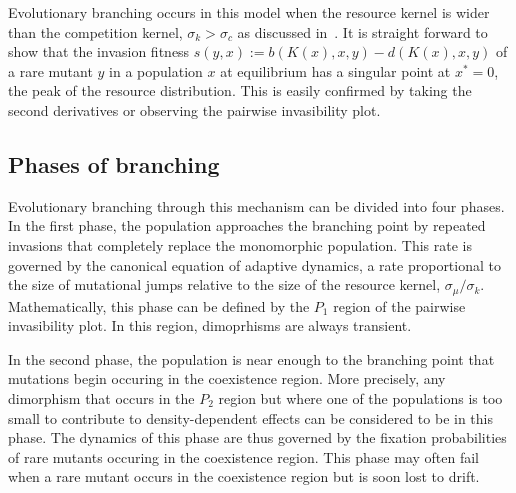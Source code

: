 \documentclass{article}
\begin{document}

Evolutionary branching occurs in this model when the resource kernel is wider than the competition kernel, $\sigma_k > \sigma_c$ as discussed in~\citet{geritz_evoeco1998, dieckmann_nat1999}.  It is straight forward to show that the invasion fitness $s(y,x) := b(K(x),x,y) -d(K(x), x,y)$ of a rare mutant $y$ in a population $x$ at equilibrium has a singular point at $x^*=0$, the peak of the resource distribution.  This is easily confirmed by taking the second derivatives or observing the pairwise invasibility plot.  


\subsection{Phases of branching}
Evolutionary branching through this mechanism can be divided into four phases.  In the first phase, the population approaches the branching point by repeated invasions that completely replace the monomorphic population.  This rate is governed by the canonical equation of adaptive dynamics, a rate proportional to the size of mutational jumps relative to the size of the resource kernel, $\sigma_{\mu}/\sigma_k$.  Mathematically, this phase can be defined by the $P_1$ region of the pairwise invasibility plot.  In this region, dimoprhisms are always transient.  

In the second phase, the population is near enough to the branching point that mutations begin occuring in the coexistence region.  More precisely, any dimorphism that occurs in the $P_2$ region but where one of the populations is too small to contribute to density-dependent effects can be considered to be in this phase.  The dynamics of this phase are thus governed by the fixation probabilities of rare mutants occuring in the coexistence region.  This phase may often fail when a rare mutant occurs in the coexistence region but is soon lost to drift.  
\end{document}
